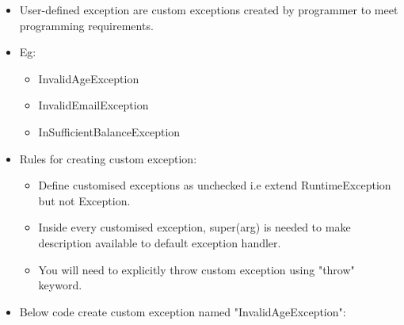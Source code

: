 \setlength{\columnsep}{3pt}
\begin{flushleft}
	
	\begin{itemize}
		\item User-defined exception are custom exceptions created by programmer to meet programming requirements. 
		\item Eg:
		\begin{itemize}
			\item InvalidAgeException
			\item InvalidEmailException
			\item InSufficientBalanceException
		\end{itemize}
		\item Rules for creating custom exception:
		\begin{itemize}
			\item Define customised exceptions as unchecked i.e extend RuntimeException but not Exception.
			\item Inside every customised exception, super(arg) is needed to make description available to default exception handler.
			\item You will need to explicitly throw custom exception using "throw" keyword.
		\end{itemize}
		\bigskip
		\item Below code create custom exception named "InvalidAgeException":
	
		\newpage
		

\end{itemize}
\end{flushleft}
